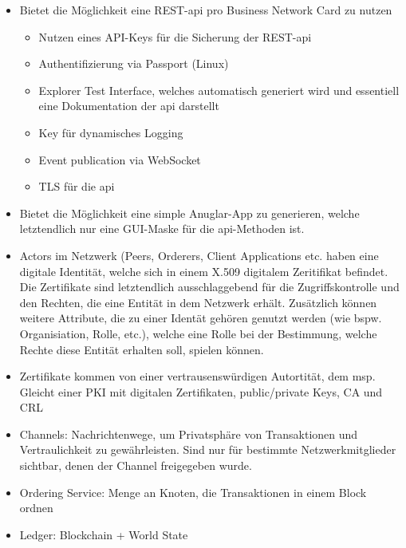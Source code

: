         \begin{itemize}[noitemsep]
            \item Bietet die Möglichkeit eine REST-\gls{api} pro Business Network Card zu nutzen
                \begin{itemize}[noitemsep]
                    \item Nutzen eines API-Keys für die Sicherung der REST-\gls{api}
                    \item Authentifizierung via Passport (Linux)
                    \item Explorer Test Interface, welches automatisch generiert wird und essentiell eine Dokumentation der \gls{api} darstellt
                    \item Key für dynamisches Logging
                    \item Event publication via WebSocket
                    \item TLS für die \gls{api}
                \end{itemize}
            \item Bietet die Möglichkeit eine simple Anuglar-App zu generieren, welche letztendlich nur eine GUI-Maske für die \gls{api}-Methoden ist.
            \item Actors im Netzwerk (Peers, Orderers, Client Applications etc. haben eine digitale Identität, welche sich in einem X.509 digitalem Zeritifikat befindet.
                Die Zertifikate sind letztendlich ausschlaggebend für die Zugriffskontrolle und den Rechten, die eine Entität in dem Netzwerk erhält. 
                Zusätzlich können weitere Attribute, die zu einer Identät gehören genutzt werden (wie bspw. Organisiation, Rolle, etc.), welche eine Rolle bei der Bestimmung, welche Rechte diese Entität erhalten soll, spielen können.
            \item Zertifikate kommen von einer vertrausenswürdigen Autortität, dem \gls{msp}. 
                Gleicht einer PKI mit digitalen Zertifikaten, public/\-private Keys, CA und CRL
            \item Channels: Nachrichtenwege, um Privatsphäre von Transaktionen und Vertraulichkeit zu gewährleisten.
                Sind nur für bestimmte Netzwerkmitglieder sichtbar, denen der Channel freigegeben wurde.
            \item Ordering Service: Menge an Knoten, die Transaktionen in einem Block ordnen
            \item Ledger: Blockchain + World State
        \end{itemize}
        
